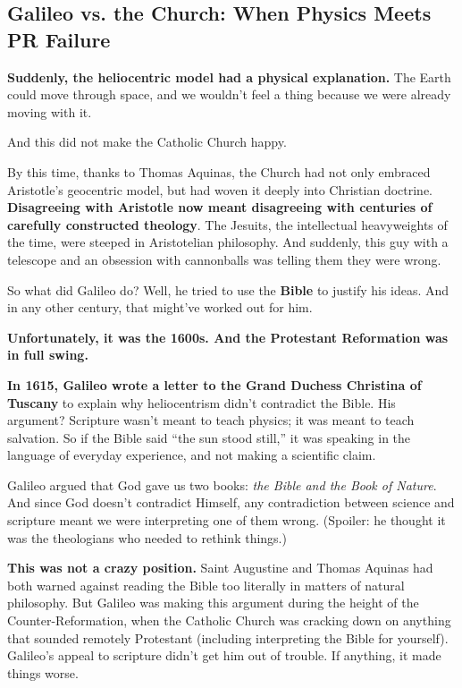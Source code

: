 \subsection{Galileo vs. the Church: When Physics Meets PR Failure}

\textbf{Suddenly, the heliocentric model had a physical explanation.} The Earth could move through space, and we wouldn’t feel a thing because we were already moving with it. 

And this did not make the Catholic Church happy.

By this time, thanks to Thomas Aquinas, the Church had not only embraced Aristotle’s geocentric model, but had woven it deeply into Christian doctrine. \textbf{Disagreeing with Aristotle now meant disagreeing with centuries of carefully constructed theology}. The Jesuits, the intellectual heavyweights of the time, were steeped in Aristotelian philosophy.  And suddenly, this guy with a telescope and an obsession with cannonballs was telling them they were wrong.

So what did Galileo do? Well, he tried to use the \textbf{Bible} to justify his ideas. And in any other century, that might’ve worked out for him.  

\textbf{Unfortunately, it was the 1600s. And the Protestant Reformation was in full swing.}

\vspace{1em}

\begin{tcolorbox}[colback=blue!5!white, colframe=blue!50!black, title=Historical Sidebar: Galileo and the Bible]

  \textbf{In 1615, Galileo wrote a letter to the Grand Duchess Christina of Tuscany} to explain why heliocentrism didn’t contradict the Bible. His argument? Scripture wasn’t meant to teach physics; it was meant to teach salvation. So if the Bible said “the sun stood still,” it was speaking in the language of everyday experience, and not making a scientific claim. 

  \medskip

  Galileo argued that God gave us two books: \emph{the Bible and the Book of Nature}. And since God doesn’t contradict Himself, any contradiction between science and scripture meant we were interpreting one of them wrong. (Spoiler: he thought it was the theologians who needed to rethink things.)

  \medskip

  \textbf{This was not a crazy position.} Saint Augustine and Thomas Aquinas had both warned against reading the Bible too literally in matters of natural philosophy. But Galileo was making this argument during the height of the Counter-Reformation, when the Catholic Church was cracking down on anything that sounded remotely Protestant (including interpreting the Bible for yourself). Galileo’s appeal to scripture didn’t get him out of trouble. If anything, it made things worse.

\end{tcolorbox}

